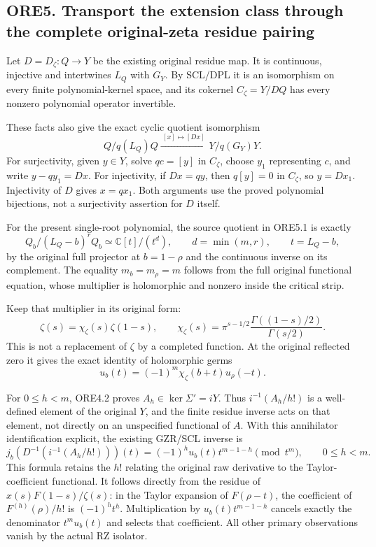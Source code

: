 \subsection{ORE5. Transport the extension class through the complete
original-zeta residue
pairing}\label{ore5.-transport-the-extension-class-through-the-complete-original-zeta-residue-pairing}

Let \(D=D_\zeta:Q\to Y\) be the existing original residue map. It is
continuous, injective and intertwines \(L_Q\) with \(G_Y\). By SCL/DPL
it is an isomorphism on every finite polynomial-kernel space, and its
cokernel \(C_\zeta=Y/DQ\) has every nonzero polynomial operator
invertible.

These facts also give the exact cyclic quotient isomorphism \[
\boxed{Q/q(L_Q)Q\xrightarrow{\ [x]\mapsto[Dx]\ }
Y/q(G_Y)Y.}
\tag{ORE5.1}
\] For surjectivity, given \(y\in Y\), solve \(q c=[y]\) in \(C_\zeta\),
choose \(y_1\) representing \(c\), and write \(y-qy_1=Dx\). For
injectivity, if \(Dx=qy\), then \(q[y]=0\) in \(C_\zeta\), so
\(y=Dx_1\). Injectivity of \(D\) gives \(x=qx_1\). Both arguments use
the proved polynomial bijections, not a surjectivity assertion for \(D\)
itself.

For the present single-root polynomial, the source quotient in ORE5.1 is
exactly \[
Q_b/(L_Q-b)^rQ_b\simeq\mathbb C[t]/(t^d),
\qquad d=\min(m,r),\qquad t=L_Q-b,
\tag{ORE5.2}
\] by the original full projector at \(b=1-\rho\) and the continuous
inverse on its complement. The equality \(m_b=m_\rho=m\) follows from
the full original functional equation, whose multiplier is holomorphic
and nonzero inside the critical strip.

Keep that multiplier in its original form: \[
\zeta(s)=\chi_\zeta(s)\zeta(1-s),\qquad
\chi_\zeta(s)=
\pi^{s-1/2}\frac{\Gamma((1-s)/2)}{\Gamma(s/2)}.
\tag{ORE5.3}
\] This is not a replacement of \(\zeta\) by a completed function. At
the original reflected zero it gives the exact identity of holomorphic
germs \[
u_b(t)=(-1)^m\chi_\zeta(b+t)u_\rho(-t).
\tag{ORE5.4}
\]

For \(0\le h<m\), ORE4.2 proves \(A_h\in\ker\Sigma'=iY\). Thus
\(i^{-1}(A_h/h!)\) is a well-defined element of the original \(Y\), and
the finite residue inverse acts on that element, not directly on an
unspecified functional of \(A\). With this annihilator identification
explicit, the existing GZR/SCL inverse is \[
j_b(D^{-1}(i^{-1}(A_h/h!)))(t)
=(-1)^h u_b(t)t^{m-1-h}\pmod {t^m},
\qquad 0\le h<m.
\tag{ORE5.5}
\] This formula retains the \(h!\) relating the original raw derivative
to the Taylor-coefficient functional. It follows directly from the
residue of \(x(s)F(1-s)/\zeta(s)\): in the Taylor expansion of
\(F(\rho-t)\), the coefficient of \(F^{(h)}(\rho)/h!\) is \((-1)^ht^h\).
Multiplication by \(u_b(t)t^{m-1-h}\) cancels exactly the denominator
\(t^m u_b(t)\) and selects that coefficient. All other primary
observations vanish by the actual RZ isolator.

